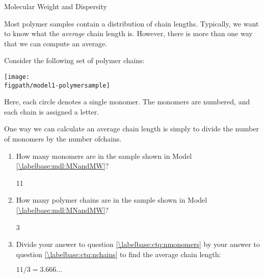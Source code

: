 \begin{activity}{Molecular Weight and Dispersity}
\begin{instructornotes}
\end{instructornotes}

\begin{model}
\label{\labelbase:mdl:MNandMW}

	Most polymer samples contain a distribution of chain lengths.  Typically, we want to know what the \emph{average} chain length is.  However, there is more than one way that we can compute an average.
	
	Consider the following set of polymer chains:
	
		\vspace{6pt}
		\centerline{\texttt{[image: \\figpath/model1-polymersample]}}
	
	Here, each circle denotes a single monomer.  The monomers are numbered, and each chain is assigned a letter.

\end{model}

\vspace{0.05in}
\begin{ctqs}

	\question One way we can calculate an average chain length is simply to divide the number of monomers by the number ofchains.
	
		\begin{enumerate}
		
			\item How many monomers are in the sample shown in Model \ref{\labelbase:mdl:MNandMW}?
				\label{\labelbase:ctq:nmonomers}
	
				\begin{solution}[0.5in]
					11
				\end{solution}
	
			\item How many polymer chains are in the sample shown in Model  \ref{\labelbase:mdl:MNandMW}?
				\label{\labelbase:ctq:nchains}
	
				\begin{solution}[0.5in]
					3
				\end{solution}
				
			\item Divide your answer to question \ref{\labelbase:ctq:nmonomers} by your answer to question \ref{\labelbase:ctq:nchains} to find the average chain length:
				\label{\labelbase:ctq:Mnsimple}
	
				\begin{solution}[0.75in]
					$11/3 = 3.666\dots$
				\end{solution}
				

\end{enumerate}
\end{ctqs}
\end{activity}
